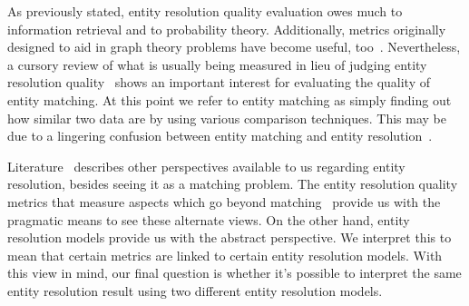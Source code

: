 As previously stated, entity resolution quality evaluation owes much to
information retrieval and to probability theory.
Additionally, metrics originally designed to aid in graph theory problems have
become useful, too~\cite{hitesh2012,Kon19}.
Nevertheless, a cursory review of what is usually being measured in lieu of
judging entity resolution quality~\cite{fever2009,Men10,Goga2015} shows an
important interest for evaluating the quality of entity matching.
At this point we refer to entity matching as simply finding out how similar two
data are by using various comparison techniques.
This may be due to a lingering confusion between entity matching and entity
resolution~\cite{Tal11}.

Literature~\cite{Tal11} describes other perspectives available to us regarding
entity resolution, besides seeing it as a matching problem.
The entity resolution quality metrics that measure aspects which go beyond
matching~\cite{Men10,tal2007algebraic} provide us with the pragmatic means to
see these alternate views.
On the other hand, entity resolution models\cite{Ben2009Swoosh,Tal11,fs1969}
provide us with the abstract perspective.
We interpret this to mean that certain metrics are linked to certain entity
resolution models.
With this view in mind, our final question is whether it's possible to interpret
the same entity resolution result using two different entity resolution models.
